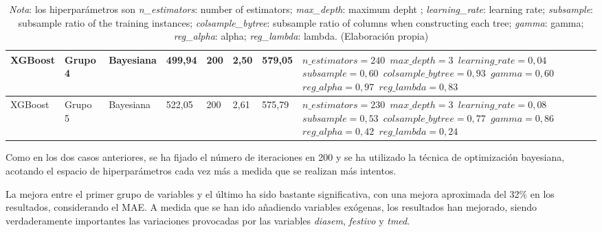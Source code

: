 \documentclass[12pt,a4paper]{report}
\begin{document}
\begin{table}[H]
\begin{tabular}{m{1cm} m{1.2cm} m{1.2cm} m{1cm} m{1cm} m{1.2cm} m{1.2cm} m{3.5cm}}
\hline
XGBoost   & Grupo 4 & Bayesiana & 499,94 & 200 & 2,50 & 579,05 & \texttt{$n\_estimators=240$ \newline $max\_depth=3$ \newline $learning\_rate=0,04$ \newline $subsample=0,60$ \newline $colsample\_bytree=0,93$ \newline $gamma=0,60$ \newline $reg\_alpha=0,97$ \newline $reg\_lambda=0,83$} \\[0.5em]
\hline
XGBoost   & Grupo 5 & Bayesiana & 522,05 & 200 & 2,61 & 575,79 & \texttt{$n\_estimators=230$ \newline $max\_depth=3$ \newline $learning\_rate=0,08$ \newline $subsample=0,53$ \newline $colsample\_bytree=0,77$ \newline $gamma=0,86$ \newline $reg\_alpha=0,42$ \newline $reg\_lambda=0,24$} \\
\bottomrule
\end{tabular}
\label{tab:resultados_optimizacion_xgboost}
\caption*{\textit{Nota}: los hiperparámetros son \textit{n\_estimators}: number of estimators; \textit{max\_depth}: maximum depht ; \textit{learning\_rate}: learning rate; \textit{subsample}: subsample ratio of the training instances; \textit{colsample\_bytree}: subsample ratio of columns when constructing each tree; \textit{gamma}: gamma; \textit{reg\_alpha}: alpha; \textit{reg\_lambda}: lambda. (Elaboración propia)}
\end{table}

Como en los dos casos anteriores, se ha fijado el número de iteraciones en 200 y se ha utilizado la técnica de optimización bayesiana, acotando el espacio de hiperparámetros cada vez más a medida que se realizan más intentos.

La mejora entre el primer grupo de variables y el último ha sido bastante significativa, con una mejora aproximada del 32$\%$ en los resultados, considerando el MAE. A medida que se han ido añadiendo variables exógenas, los resultados han mejorado, siendo verdaderamente importantes las variaciones provocadas por las variables \textit{diasem}, \textit{festivo} y \textit{tmed}.
\end{document}
